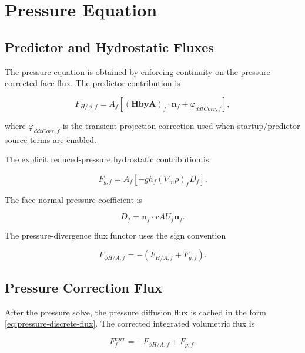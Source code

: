 \documentclass[11pt]{article}
\newcommand{\grad}{\nabla}
\begin{document}
\section{Pressure Equation}

\subsection{Predictor and Hydrostatic Fluxes}

The pressure equation is obtained by enforcing continuity on the pressure
corrected face flux.  The predictor contribution is

\begin{equation}
  F_{H/A,f}
  =
  A_f
  \left[
    (\mathbf{HbyA})_f\cdot\mathbf{n}_f
    +
    \varphi_{ddtCorr,f}
  \right],
  \label{eq:fhbya}
\end{equation}

where \(\varphi_{ddtCorr,f}\) is the transient projection correction used when
startup/predictor source terms are enabled.

The explicit reduced-pressure hydrostatic contribution is

\begin{equation}
  F_{g,f}
  =
  A_f
  \left[
    -gh_f
    (\grad_n\rho)_f
    D_f
  \right].
  \label{eq:phig}
\end{equation}

The face-normal pressure coefficient is

\begin{equation}
  D_f=\mathbf{n}_f\cdot rAU_f\mathbf{n}_f.
  \label{eq:pressure-coefficient}
\end{equation}

The pressure-divergence flux functor uses the sign convention

\begin{equation}
  F_{\phi H/A,f}
  =
  -(F_{H/A,f}+F_{g,f}).
  \label{eq:stored-phi-hbya}
\end{equation}

\subsection{Pressure Correction Flux}

After the pressure solve, the pressure diffusion flux is cached in the form
\eqref{eq:pressure-discrete-flux}.  The corrected integrated volumetric flux is

\begin{equation}
  F_f^{corr}
  =
  -F_{\phi H/A,f}
  +
  F_{p,f}.
  \label{eq:corrected-integrated-flux}
\end{equation}
\end{document}
